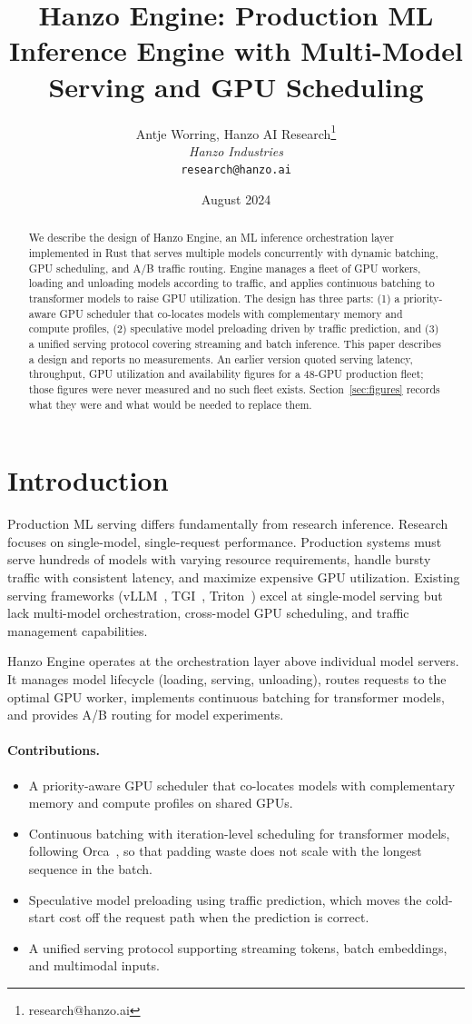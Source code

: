 \documentclass[11pt,twocolumn]{article}
\title{Hanzo Engine: Production ML Inference Engine with Multi-Model Serving and GPU Scheduling}
\author{Antje Worring, Hanzo AI Research\thanks{research@hanzo.ai} \\ \textit{Hanzo Industries} \\ \texttt{research@hanzo.ai}}
\date{August 2024}
\begin{document}
\hanzocoverpage

\begin{abstract}
We describe the design of Hanzo Engine, an ML inference orchestration layer implemented in Rust that serves multiple models concurrently with dynamic batching, GPU scheduling, and A/B traffic routing. Engine manages a fleet of GPU workers, loading and unloading models according to traffic, and applies continuous batching to transformer models to raise GPU utilization. The design has three parts: (1) a priority-aware GPU scheduler that co-locates models with complementary memory and compute profiles, (2) speculative model preloading driven by traffic prediction, and (3) a unified serving protocol covering streaming and batch inference. This paper describes a design and reports no measurements. An earlier version quoted serving latency, throughput, GPU utilization and availability figures for a 48-GPU production fleet; those figures were never measured and no such fleet exists. Section~\ref{sec:figures} records what they were and what would be needed to replace them.
\end{abstract}

\section{Introduction}

Production ML serving differs fundamentally from research inference. Research focuses on single-model, single-request performance. Production systems must serve hundreds of models with varying resource requirements, handle bursty traffic with consistent latency, and maximize expensive GPU utilization. Existing serving frameworks (vLLM~\cite{kwon2023}, TGI~\cite{tgi2023}, Triton~\cite{triton2020}) excel at single-model serving but lack multi-model orchestration, cross-model GPU scheduling, and traffic management capabilities.

Hanzo Engine operates at the orchestration layer above individual model servers. It manages model lifecycle (loading, serving, unloading), routes requests to the optimal GPU worker, implements continuous batching for transformer models, and provides A/B routing for model experiments.

\paragraph{Contributions.}
\begin{itemize}
    \item A priority-aware GPU scheduler that co-locates models with complementary memory and compute profiles on shared GPUs.
    \item Continuous batching with iteration-level scheduling for transformer models, following Orca~\cite{yu2022}, so that padding waste does not scale with the longest sequence in the batch.
    \item Speculative model preloading using traffic prediction, which moves the cold-start cost off the request path when the prediction is correct.
    \item A unified serving protocol supporting streaming tokens, batch embeddings, and multimodal inputs.
\end{itemize}
\end{document}
